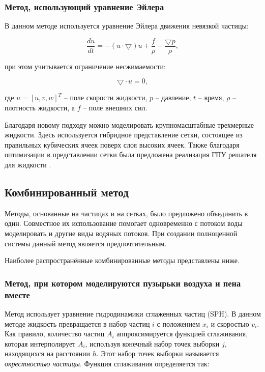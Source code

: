 \subsubsection{Метод, использующий уравнение Эйлера}

В данном методе используется уравнение Эйлера движения невязкой частицы:

\begin{equation}
    \frac{du}{dt} = -(u \cdot \bigtriangledown)u + \frac{f}{\rho} - \frac{\bigtriangledown p}{\rho},
\end{equation}

при этом учитывается ограничение несжимаемости:

\begin{equation}
    \bigtriangledown \cdot u = 0,
\end{equation}

где $u = [u, v, w]^T$ -- поле скорости жидкости, $p$ -- давление, $t$ -- время, $\rho$ -- плотность жидкости, а $f$ -- поле внешних сил.

Благодаря новому подходу можно моделировать крупномасштабные трехмерные жидкости. Здесь используется гибридное представление сетки, состоящее из правильных кубических ячеек поверх слоя высоких ячеек. Также благодаря оптимизации в представлении сетки была предложена реализация ГПУ решателя для жидкости \cite{eiler-equation-grid}.


\subsection{Комбинированный метод}
Методы, основанные на частицах и на сетках, было предложено объединить в один. Совместное их использование помогает одновременно с потоком воды моделировать и другие виды водяных потоков. При создании полноценной системы данный метод является предпочтительным.

Наиболее распространённые комбинированные методы представлены ниже.

\subsubsection{Метод, при котором моделируются пузырьки воздуха и пена вместе}

Метод использует уравнение гидродинамики сглаженных частиц (SPH). В данном методе жидкость превращается в набор частиц $i$ с положением $x_i$ и скоростью $v_i$. Как правило, количество частиц $A_i$ аппроксимируется функцией сглаживания, которая интерполирует $A_i$, используя конечный набор точек выборки $j$, находящихся на расстоянии $h$. Этот набор точек выборки называется \textit{окрестностью частицы}. Функция сглаживания определяется так:

